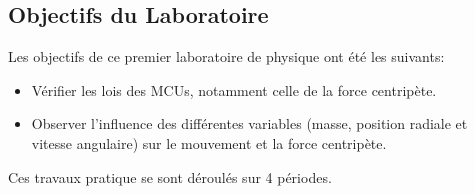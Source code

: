 \subsection{Objectifs du Laboratoire}

Les objectifs de ce premier laboratoire de physique ont été les suivants:
\begin{itemize}
    \item Vérifier les lois des MCUs, notamment celle de la force centripète.
    \item Observer l'influence des différentes variables (masse, position radiale et vitesse angulaire) sur le mouvement et la force centripète.
\end{itemize}

Ces travaux pratique se sont déroulés sur 4 périodes.
